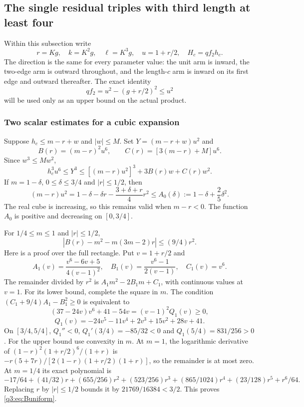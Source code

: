 \subsection{The single residual triples with third length at least four}\label{q3:app:triples}
Within this subsection write
\[
 r=Kg,\quad k=K^2g,\quad \ell=K^3g,\quad
 u=1+r/2,\quad H_c=qf_2h_c .
\]
The direction is the same for every parameter value: the unit arm is inward, the two-edge arm is outward throughout, and the length-$c$ arm is inward on its first edge and outward thereafter. The exact identity
\begin{equation}\label{q3:eq:shortsquare}
 qf_2=u^2-(g+r/2)^2\le u^2
\end{equation}
will be used only as an upper bound on the actual product.

\subsubsection{Two scalar estimates for a cubic expansion}
Suppose $h_c\le m-r+w$ and $|w|\le M$. Set $Y=(m-r+w)u^2$ and
\[
 B(r)=(m-r)^2u^6,\qquad C(r)=[3(m-r)+M]u^6.
\]
Since $w^3\le Mw^2$,
\begin{equation}\label{q3:eq:Yexpansion}
 h_c^3u^6\le Y^3\le[(m-r)u^2]^3+3B(r)w+C(r)w^2.
\end{equation}
If $m=1-\delta$, $0\le\delta\le3/4$ and $|r|\le1/2$, then
\begin{equation}\label{q3:eq:Aenvelope}
 (m-r)u^2
 =1-\delta-\delta r-\frac{3+\delta+r}{4}r^2
 \le A_0(\delta):=1-\delta+\frac25\delta^2.
\end{equation}
The real cube is increasing, so this remains valid when $m-r<0$. The function $A_0$ is positive and decreasing on $[0,3/4]$.

For $1/4\le m\le1$ and $|r|\le1/2$,
\begin{equation}\label{q3:eq:Buniform}
 |B(r)-m^2-m(3m-2)r|\le(9/4)r^2 .
\end{equation}
Here is a proof over the full rectangle. Put $v=1+r/2$ and
\[
 A_1(v)=\frac{v^6-6v+5}{4(v-1)^2},\quad
 B_1(v)=\frac{v^6-1}{2(v-1)},\quad C_1(v)=v^6.
\]
The remainder divided by $r^2$ is $A_1m^2-2B_1m+C_1$, with continuous values at $v=1$. For its lower bound, complete the square in $m$. The condition
$(C_1+9/4)A_1-B_1^2\ge0$ is equivalent to
\[
 (37-24v)v^6+41-54v=(v-1)^2Q_1(v)\ge0,
\]
\[
 Q_1(v)=-24v^5-11v^4+2v^3+15v^2+28v+41 .
\]
On $[3/4,5/4]$, $Q_1''<0$, $Q_1'(3/4)=-85/32<0$ and $Q_1(5/4)=831/256>0$.
For the upper bound use convexity in $m$. At $m=1$, the logarithmic derivative of
$(1-r)^2(1+r/2)^6/(1+r)$ is
$-r(5+7r)/[2(1-r)(1+r/2)(1+r)]$, so the remainder is at most zero.
At $m=1/4$ its exact polynomial is
\[
 -17/64+(41/32)r+(655/256)r^2+(523/256)r^3+
 (865/1024)r^4+(23/128)r^5+r^6/64 .
\]
Replacing $r$ by $|r|\le1/2$ bounds it by $21769/16384<3/2$. This proves \eqref{q3:eq:Buniform}.

